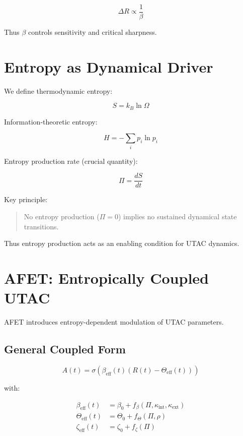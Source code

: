 \documentclass[12pt]{article}
\begin{document}
\begin{equation}
\Delta R \propto \frac{1}{\beta}
\end{equation}

Thus $\beta$ controls sensitivity and critical sharpness.

\section{Entropy as Dynamical Driver}

We define thermodynamic entropy:

\begin{equation}
S = k_B \ln \Omega
\end{equation}

Information-theoretic entropy:

\begin{equation}
H = - \sum_i p_i \ln p_i
\end{equation}

Entropy production rate (crucial quantity):

\begin{equation}
\Pi = \frac{dS}{dt}
\end{equation}

Key principle:

\begin{quote}
No entropy production ($\Pi = 0$) implies no sustained dynamical state transitions.
\end{quote}

Thus entropy production acts as an enabling condition for UTAC dynamics.

\section{AFET: Entropically Coupled UTAC}

AFET introduces entropy-dependent modulation of UTAC parameters.

\subsection{General Coupled Form}

\begin{equation}
A(t) = \sigma\left(
\beta_{\text{eff}}(t) 
\left(
R(t) - \Theta_{\text{eff}}(t)
\right)
\right)
\end{equation}

with:

\begin{align}
\beta_{\text{eff}}(t) &= \beta_0 + f_\beta(\Pi, \kappa_{\text{int}}, \kappa_{\text{ext}}) \\
\Theta_{\text{eff}}(t) &= \Theta_0 + f_\Theta(\Pi, \rho) \\
\zeta_{\text{eff}}(t) &= \zeta_0 + f_\zeta(\Pi)
\end{align}
\end{document}
